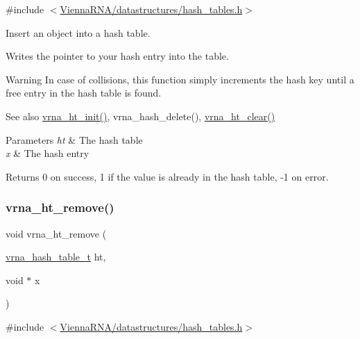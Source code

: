 {\ttfamily \#include $<$\mbox{\hyperlink{hash__tables_8h}{Vienna\+R\+N\+A/datastructures/hash\+\_\+tables.\+h}}$>$}



Insert an object into a hash table. 

Writes the pointer to your hash entry into the table.

\begin{DoxyWarning}{Warning}
In case of collisions, this function simply increments the hash key until a free entry in the hash table is found.
\end{DoxyWarning}
\begin{DoxySeeAlso}{See also}
\mbox{\hyperlink{group__hash__table__utils_ga37d1c7e13087a2b7c1b87fda34577c29}{vrna\+\_\+ht\+\_\+init()}}, vrna\+\_\+hash\+\_\+delete(), \mbox{\hyperlink{group__hash__table__utils_gab90583f8f7395e735c865ad2ebdb3c29}{vrna\+\_\+ht\+\_\+clear()}}
\end{DoxySeeAlso}

\begin{DoxyParams}{Parameters}
{\em ht} & The hash table \\
\hline
{\em x} & The hash entry \\
\hline
\end{DoxyParams}
\begin{DoxyReturn}{Returns}
0 on success, 1 if the value is already in the hash table, -\/1 on error. 
\end{DoxyReturn}
\mbox{\label{group__hash__table__utils_ga1162aa0d1bd82af7420bb727a87d3e2f}} 
\subsubsection{\texorpdfstring{vrna\_ht\_remove()}{vrna\_ht\_remove()}}
{\footnotesize\ttfamily void vrna\+\_\+ht\+\_\+remove (\begin{DoxyParamCaption}\item[{\mbox{\hyperlink{group__hash__table__utils_gabc7c6f41b718c8e23929e528891a89c4}{vrna\+\_\+hash\+\_\+table\+\_\+t}}}]{ht,  }\item[{void $\ast$}]{x }\end{DoxyParamCaption})}



{\ttfamily \#include $<$\mbox{\hyperlink{hash__tables_8h}{Vienna\+R\+N\+A/datastructures/hash\+\_\+tables.\+h}}$>$}




